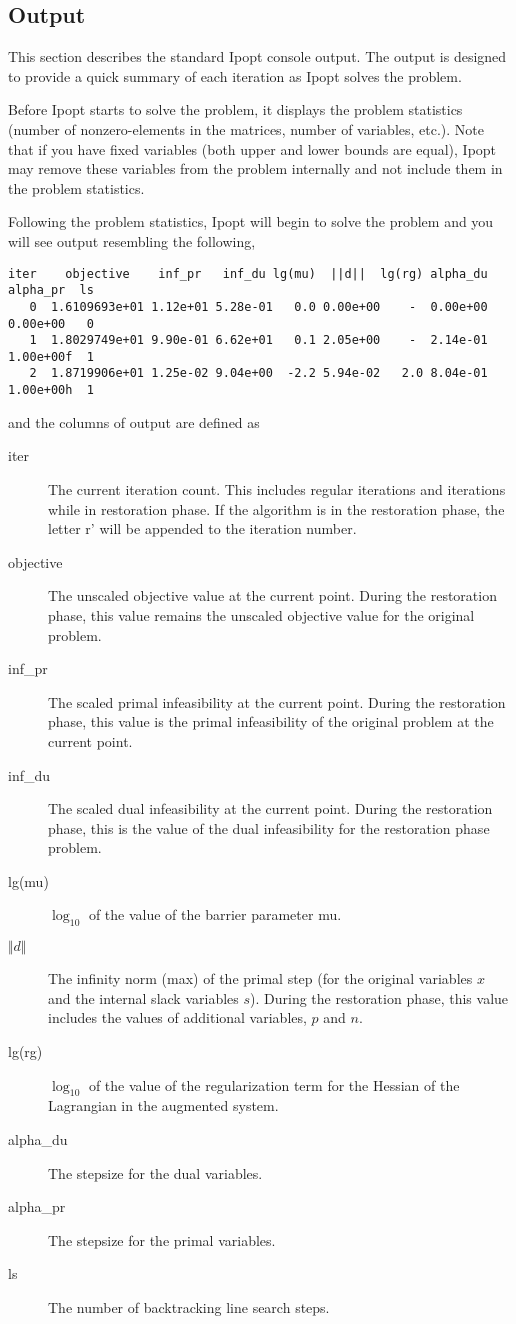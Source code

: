 \subsection{Output}

This section describes the standard Ipopt console output.
The output is designed to provide a quick summary of each iteration as Ipopt solves the problem.

Before Ipopt starts to solve the problem, it displays the problem statistics (number of nonzero-elements in the matrices, number of variables, etc.).
Note that if you have fixed variables (both upper and lower bounds are equal), Ipopt may remove these variables from the problem internally and not include them in the problem statistics.

Following the problem statistics, Ipopt will begin to solve the problem and you will see output resembling the following,
\begin{verbatim}
iter    objective    inf_pr   inf_du lg(mu)  ||d||  lg(rg) alpha_du alpha_pr  ls
   0  1.6109693e+01 1.12e+01 5.28e-01   0.0 0.00e+00    -  0.00e+00 0.00e+00   0
   1  1.8029749e+01 9.90e-01 6.62e+01   0.1 2.05e+00    -  2.14e-01 1.00e+00f  1
   2  1.8719906e+01 1.25e-02 9.04e+00  -2.2 5.94e-02   2.0 8.04e-01 1.00e+00h  1
\end{verbatim}
and the columns of output are defined as
\begin{description}
\item[iter]
The current iteration count.
This includes regular iterations and iterations while in restoration phase.
If the algorithm is in the restoration phase, the letter r' will be appended to the iteration number.
\item[objective]
The unscaled objective value at the current point.
During the restoration phase, this value remains the unscaled objective value for the original problem.
\item[inf\_pr]
The scaled primal infeasibility at the current point.
During the restoration phase, this value is the primal infeasibility of the original problem at the current point.
\item[inf\_du]
The scaled dual infeasibility at the current point.
During the restoration phase, this is the value of the dual infeasibility for the restoration phase problem.
\item[lg(mu)]
$\log_{10}$ of the value of the barrier parameter mu.
\item[$\Vert d\Vert$]
The infinity norm (max) of the primal step (for the original variables $x$ and the internal slack variables $s$).
During the restoration phase, this value includes the values of additional variables, $p$ and $n$.
\item[lg(rg)]
$\log_{10}$ of the value of the regularization term for the Hessian of the Lagrangian in the augmented system.
\item[alpha\_du]
The stepsize for the dual variables.
\item[alpha\_pr]
The stepsize for the primal variables.
\item[ls]
The number of backtracking line search steps.
\end{description}

